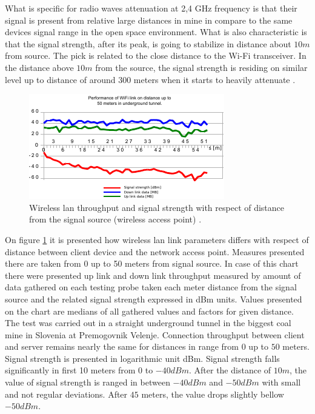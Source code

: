 \documentclass[../main.tex]{subfiles}
\begin{document}
What is specific for radio waves attenuation at 2,4 GHz frequency is that their signal is present from relative large distances in mine in compare to the same devices signal range in the open space environment. What is also characteristic is that the signal strength, after its peak, is going to stabilize in distance about $10m$ from source. The pick is related to the close distance to the Wi-Fi transceiver. In the distance above $10m$ from the source, the signal strength is residing on similar level up to distance of around $300$ meters when it starts to heavily attenuate \cite{Thesis_CM}.

\begin{figure}[!htbp]
\includegraphics[width=\textwidth]{pictures/wifi_link_short.pdf}
\centering
\caption{Wireless lan throughput and signal strength with respect of distance from the signal source (wireless access point) \cite{Thesis_CM}. }
\label{fig:wifi_link_short}
\end{figure}


On figure \ref{fig:wifi_link_short} it is presented how wireless lan link parameters differs with respect of distance between client device and the network access point. Measures presented there are taken from 0 up to 50 meters from signal source. In case of this chart there were presented up link and down link throughput measured by amount of data gathered on each testing probe taken each meter distance from the signal source and the related signal strength expressed in dBm units. Values presented on the chart are medians of all gathered values and factors for given distance. The test was carried out in a straight underground tunnel in the biggest coal mine in Slovenia at Premogovnik Velenje. Connection throughput between client and server remains nearly the same for distances in range from $0$ up to $50$ meters. Signal strength is presented in logarithmic unit dBm. Signal strength falls significantly in first 10 meters from $0$ to $-40 dBm$. After the distance of $10m$, the value of signal strength is ranged in between $-40 dBm$ and $-50 dBm$ with small and not regular deviations. After $45$ meters, the value drops slightly bellow $-50 dBm$.
\end{document}
